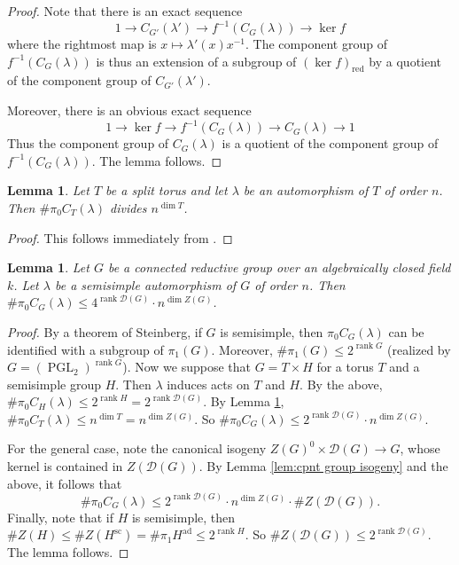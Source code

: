 \documentclass[11pt, letterpaper,english]{amsart}
\theoremstyle{plain}
\newtheorem{lemma}[lem]{Lemma}
\theoremstyle{definition}
\numberwithin{equation}{section}
\numberwithin{lem}{section}
\newcommand{\sD}{{\mathscr D}}
\DeclareMathOperator{\rank}{rank}
\DeclareMathOperator{\PGL}{PGL}
\newcommand{\cent}[2]{C_{#1}(#2)}
\begin{document}
\begin{proof}
Note that there is an exact sequence 
\[
1 \to \cent{G'}{\lambda'} \to f^{-1}(\cent{G}{\lambda}) \to \ker f
\]
where the rightmost map is $x \mapsto \lambda'(x) x^{-1}$. The component group of $f^{-1}(\cent{G}{\lambda})$ is thus an extension of a subgroup of $(\ker f)_{\mathrm{red}}$ by a quotient of the component group of $\cent{G'}{\lambda'}$. 

Moreover, there is an obvious exact sequence
\[
1 \to \ker f \to f^{-1}(\cent{G}{\lambda}) \to \cent{G}{\lambda} \to 1
\]
Thus the component group of $\cent{G}{\lambda}$ is a quotient of the component group of $f^{-1}(\cent{G}{\lambda})$. The lemma follows.  
\end{proof}

\begin{lemma} \label{lem:autom of tori}
Let $T$ be a split torus and let $\lambda$ be an automorphism of $T$ of order $n$. Then $\# \pi_0 \cent{T}{\lambda}$ divides $n^{\dim T}$.
\end{lemma}

\begin{proof}
This follows immediately from \cite[Lemma 1.2(1)]{dm18}.
\end{proof}

\begin{lemma} \label{lem:lambda bound}
Let $G$ be a connected reductive group over an algebraically closed field $k$. Let $\lambda$ be a semisimple automorphism of $G$ of order $n$. Then $\# \pi_0 \cent{G}{\lambda} \leq 4^{\rank \sD(G)} \cdot n^{\dim Z(G)}$. 
\end{lemma}

\begin{proof}
By a theorem of Steinberg, if $G$ is semisimple, then $\pi_0 \cent{G}{\lambda}$ can be identified with a subgroup of $\pi_1(G)$. Moreover, $\# \pi_1(G) \leq 2^{\rank G}$ (realized by $G=(\PGL_2)^{\rank G}$). 
Now we suppose that $G = T \times H$ for a torus $T$ and a semisimple group $H$. Then $\lambda$ induces acts on $T$ and $H$. By the above, $\# \pi_0 \cent{H}{\lambda} \leq 2^{\rank H}=2^{\rank \sD(G)}$. By Lemma \ref{lem:autom of tori}, $\# \pi_0 \cent{T}{\lambda} \leq n^{\dim T} = n^{\dim Z(G)}$. So $\# \pi_0 \cent{G}{\lambda} \leq 2^{\rank \sD(G)} \cdot n^{\dim Z(G)}$.

For the general case, note the canonical isogeny $Z(G)^0 \times \sD(G) \to G$, whose kernel is contained in $Z(\sD(G))$. By Lemma \ref{lem:cpnt group isogeny} and the above, it follows that 
\[ \# \pi_0 \cent{G}{\lambda} \leq 2^{\rank \sD(G)} \cdot n^{\dim Z(G)} \cdot \#Z(\sD(G)). \]
Finally, note that if $H$ is semisimple, then $\#Z(H) \leq \#Z(H^{\mathrm{sc}})=\#\pi_1 H^{\mathrm{ad}} \leq 2^{\rank H}$. So $\#Z(\sD(G)) \leq 2^{\rank \sD(G)}$. The lemma follows. 
\end{proof}
\end{document}
